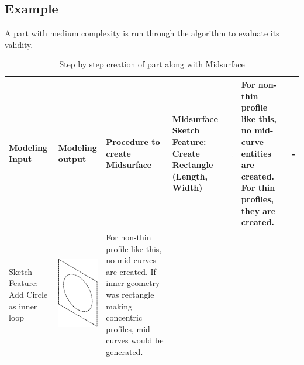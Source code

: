 \subsection{Example}

A part with medium complexity is run through the algorithm to evaluate its validity.



\begin{longtable}{ L{0.18\textwidth} C{0.18\textwidth} L{0.38\textwidth}  C{0.18\textwidth}}
\caption{Step by step creation of part along with Midsurface}\\
\hline
{\bf Modeling Input} & {\bf Modeling output} & {\bf Procedure to create Midsurface} & {\bf Midsurface}\endhead
\hline
\hline
Sketch Feature:
Create Rectangle (Length, Width) &
\includegraphics[scale=0.3]{..//Common/images//DryRun1.png} &
For non-thin profile like this, no mid-curve entities are created. For thin profiles, they are created. &
- \\
\hline
Sketch Feature: Add Circle as inner loop &
\includegraphics[scale=0.3]{..//Common/images//DryRun2.png} &
For non-thin profile like this, no mid-curves are created. If inner geometry was rectangle making concentric profiles, mid-curves would be generated. &

\end{longtable}
